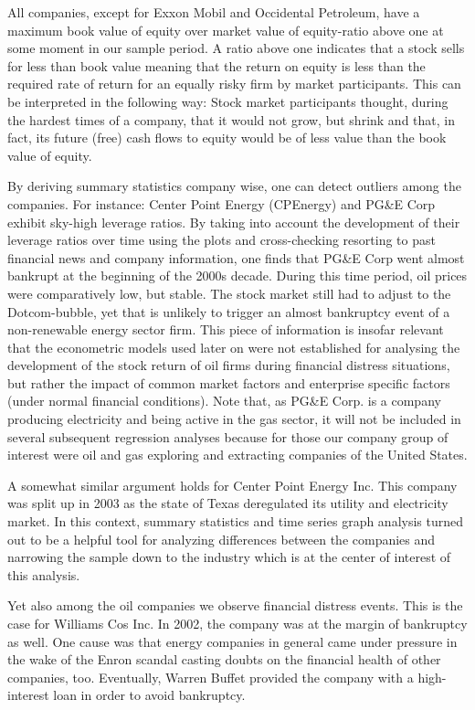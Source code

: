 \documentclass[a4paper]{article}
\begin{document}
All companies, except for Exxon Mobil and Occidental Petroleum, have a maximum book value of equity over market value of equity-ratio above one at some moment in our sample period. A ratio above one indicates that a stock sells for less than book value meaning that the return on equity is less than the required rate of return for an equally risky firm by market participants. This can be interpreted in the following way: Stock market participants thought, during the hardest times of a company, that it would not grow, but shrink and that, in fact, its future (free) cash flows to equity would be of less value than the book value of equity.

By deriving summary statistics company wise, one can detect outliers among the companies. For instance: Center Point Energy (CPEnergy) and PG\&E Corp exhibit sky-high leverage ratios. By taking into account the development of their leverage ratios over time using the plots and cross-checking resorting to past financial news and company information, one finds that PG\&E Corp went almost bankrupt at the beginning of the 2000s decade. During this time period, oil prices were comparatively low, but stable. The stock market still had to adjust to the Dotcom-bubble, yet that is unlikely to trigger an almost bankruptcy event of a non-renewable energy sector firm. This piece of information is insofar relevant that the econometric models used later on were not established for analysing the development of the stock return of oil firms during  financial distress situations, but rather the impact of common market factors and enterprise specific factors (under normal financial conditions). Note that, as PG\&E Corp. is a company producing electricity and being active in the gas sector, it will not be included in several subsequent regression analyses because for those our company group of interest were oil and gas exploring and extracting companies of the United States. 

A somewhat similar argument holds for Center Point Energy Inc. This company was split up in 2003 as the state of Texas deregulated its utility and electricity market. In this context, summary statistics and time series graph analysis turned out to be a helpful tool for analyzing differences between the companies and narrowing the sample down to the industry which is at the center of interest of this analysis.

Yet also among the oil companies we observe financial distress events. This is the case for Williams Cos Inc. In 2002, the company was at the margin of bankruptcy as well. One cause was that energy companies in general came under pressure in the wake of the Enron scandal casting doubts on the financial health of other companies, too. Eventually, Warren Buffet provided the company with a high-interest loan in order to avoid bankruptcy.
\end{document}
